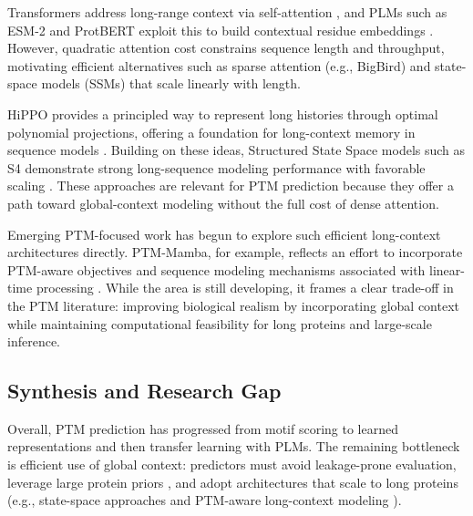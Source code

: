 \documentclass[conference]{IEEEtran}
\begin{document}
Transformers address long-range context via self-attention \cite{vaswani2017attention}, and PLMs such as ESM-2 and ProtBERT exploit this to build contextual residue embeddings \cite{lin2022,elnaggar2020}. However, quadratic attention cost constrains sequence length and throughput, motivating efficient alternatives such as sparse attention (e.g., BigBird) \cite{zaheer2020bigbird} and state-space models (SSMs) that scale linearly with length.

HiPPO provides a principled way to represent long histories through optimal polynomial projections, offering a foundation for long-context memory in sequence models \cite{gu2020hippo}. Building on these ideas, Structured State Space models such as S4 demonstrate strong long-sequence modeling performance with favorable scaling \cite{gu2022s4}. These approaches are relevant for PTM prediction because they offer a path toward global-context modeling without the full cost of dense attention.

Emerging PTM-focused work has begun to explore such efficient long-context architectures directly. PTM-Mamba, for example, reflects an effort to incorporate PTM-aware objectives and sequence modeling mechanisms associated with linear-time processing \cite{peng2024ptm}. While the area is still developing, it frames a clear trade-off in the PTM literature: improving biological realism by incorporating global context while maintaining computational feasibility for long proteins and large-scale inference.


\subsection{Synthesis and Research Gap}
Overall, PTM prediction has progressed from motif scoring to learned representations and then transfer learning with PLMs. The remaining bottleneck is efficient use of global context: predictors must avoid leakage-prone evaluation, leverage large protein priors \cite{elnaggar2020,lin2022,rives2021scaling}, and adopt architectures that scale to long proteins (e.g., state-space approaches \cite{gu2020hippo,gu2022s4} and PTM-aware long-context modeling \cite{peng2024ptm}).

\clearpage



\end{document}
